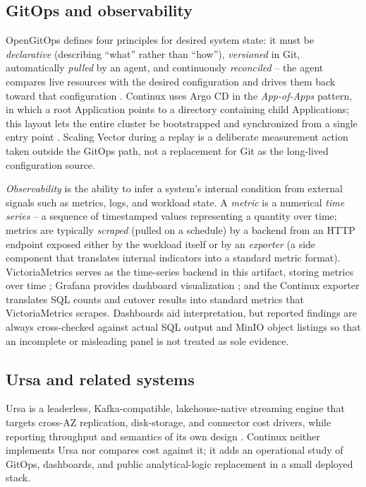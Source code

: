 \subsection{GitOps and observability}
OpenGitOps defines four principles for desired system state: it must be \emph{declarative} (describing ``what'' rather than ``how''), \emph{versioned} in Git, automatically \emph{pulled} by an agent, and continuously \emph{reconciled} -- the agent compares live resources with the desired configuration and drives them back toward that configuration \parencite{opengitops}. Continux uses Argo CD in the \emph{App-of-Apps} pattern, in which a root Application points to a directory containing child Applications; this layout lets the entire cluster be bootstrapped and synchronized from a single entry point \parencite{argocddocs}. Scaling Vector during a replay is a deliberate measurement action taken outside the GitOps path, not a replacement for Git as the long-lived configuration source.

\emph{Observability} is the ability to infer a system's internal condition from external signals such as metrics, logs, and workload state. A \emph{metric} is a numerical \emph{time series} -- a sequence of timestamped values representing a quantity over time; metrics are typically \emph{scraped} (pulled on a schedule) by a backend from an HTTP endpoint exposed either by the workload itself or by an \emph{exporter} (a side component that translates internal indicators into a standard metric format). VictoriaMetrics serves as the time-series backend in this artifact, storing metrics over time \parencite{victoriametricsdocs}; Grafana provides dashboard visualization \parencite{grafanadocs}; and the Continux exporter translates SQL counts and cutover results into standard metrics that VictoriaMetrics scrapes. Dashboards aid interpretation, but reported findings are always cross-checked against actual SQL output and MinIO object listings so that an incomplete or misleading panel is not treated as sole evidence.

\subsection{Ursa and related systems}
Ursa is a leaderless, Kafka-compatible, lakehouse-native streaming engine that targets cross-AZ replication, disk-storage, and connector cost drivers, while reporting throughput and semantics of its own design \parencite{merli2025ursa}. Continux neither implements Ursa nor compares cost against it; it adds an operational study of GitOps, dashboards, and public analytical-logic replacement in a small deployed stack.

